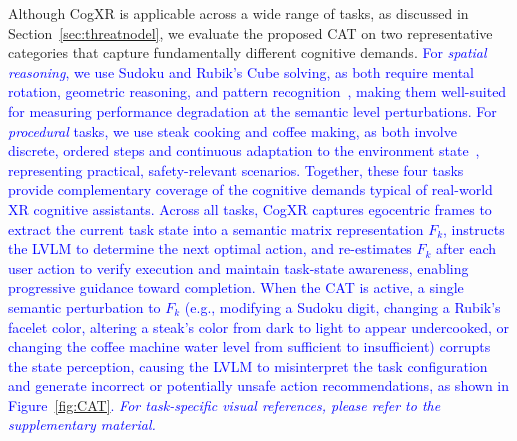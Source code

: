 \documentclass[sigconf,review,anonymous]{acmart}
\begin{document}
Although CogXR is applicable across a wide range of tasks, as discussed in Section~\ref{sec:threatnodel}, we evaluate the proposed CAT on two representative categories that capture fundamentally different cognitive demands. \textcolor{blue}{For \emph{spatial reasoning}, we use Sudoku and Rubik's Cube solving, as both require mental rotation, geometric reasoning, and pattern recognition~\cite{ren2025rubikon,hajahmadi2024investigating, dugar2024augmented, qu2024looking}, making them well-suited for measuring performance degradation at the semantic level perturbations. For \emph{procedural} tasks, we use steak cooking and coffee making, as both involve discrete, ordered steps and continuous adaptation to the environment state~\cite{srinidhi2024xair,qorbani2025teaching, majil2022augmented, ghasemi2023embedding, bonnetto2025epfl}, representing practical, safety-relevant scenarios. Together, these four tasks provide complementary coverage of the cognitive demands typical of real-world XR cognitive assistants. Across all tasks, CogXR captures egocentric frames to extract the current task state into a semantic matrix representation \(F_k\), instructs the LVLM to determine the next optimal action, and re-estimates \(F_k\) after each user action to verify execution and maintain task-state awareness, enabling progressive guidance toward completion. When the CAT is active, a single semantic perturbation to \(F_k\) (e.g., modifying a Sudoku digit, changing a Rubik's facelet color, altering a steak's color from dark to light to appear undercooked, or changing the coffee machine water level from sufficient to insufficient) corrupts the state perception, causing the LVLM to misinterpret the task configuration and generate incorrect or potentially unsafe action recommendations, as shown in Figure~\ref{fig:CAT}. \textit{For task-specific visual references, please refer to the supplementary material.}}


\end{document}
